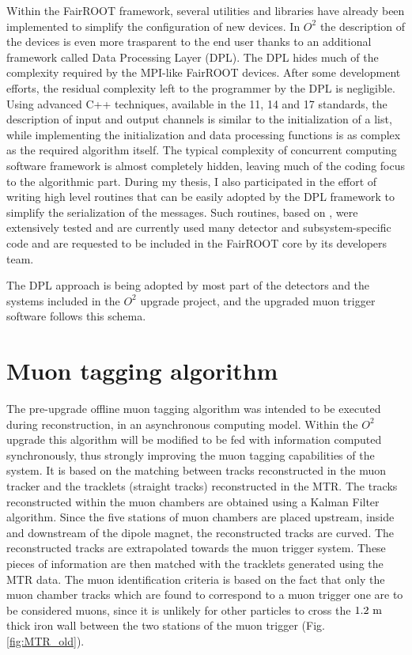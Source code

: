Within the FairROOT framework, several utilities and libraries have already been implemented to simplify the configuration of new devices.
In $O^2$ the description of the devices is even more trasparent to the end user thanks to an additional framework called Data Processing Layer (DPL).
The DPL hides much of the complexity required by the MPI-like FairROOT devices.
After some development efforts, the residual complexity left to the programmer by the DPL is negligible.
Using advanced C++ techniques, available in the 11, 14 and 17 standards, the description of input and output channels is similar to the initialization of a list, while implementing the initialization and data processing functions is as complex as the required algorithm itself.
The typical complexity of concurrent computing software framework is almost completely hidden, leaving much of the coding focus to the algorithmic part.
During my thesis, I also participated in the effort of writing high level routines that can be easily adopted by the DPL framework to simplify the serialization of the messages. 
Such routines, based on , were extensively tested and are currently used many detector and subsystem-specific code and are requested to be included in the FairROOT core by its developers team.

The DPL approach is being adopted by most part of the detectors and the systems included in the $O^2$ upgrade project, and the upgraded muon trigger software follows this schema.

\section{Muon tagging algorithm}
\label{MTR_tagging}
The pre-upgrade offline muon tagging algorithm was intended to be executed during reconstruction, in an asynchronous computing model.
Within the $O^2$ upgrade this algorithm will be modified to be fed with information computed synchronously, thus strongly improving the muon tagging capabilities of the system.
It is based on the matching between tracks reconstructed in the muon tracker and the tracklets (straight tracks) reconstructed in the MTR.
The tracks reconstructed within the muon chambers are obtained using a Kalman Filter algorithm.
Since the five stations of muon chambers are placed upstream, inside and downstream of the dipole magnet, the reconstructed tracks are curved.
The reconstructed tracks are extrapolated towards the muon trigger system.
These pieces of information are then matched with the tracklets generated using the MTR data.
The muon identification criteria is based on the fact that only the muon chamber tracks which are found to correspond to a muon trigger one are to be considered muons, since it is unlikely for other particles to cross the $1.2\ \rm m$ thick iron wall between the two stations of the muon trigger (Fig. \ref{fig:MTR_old}).


